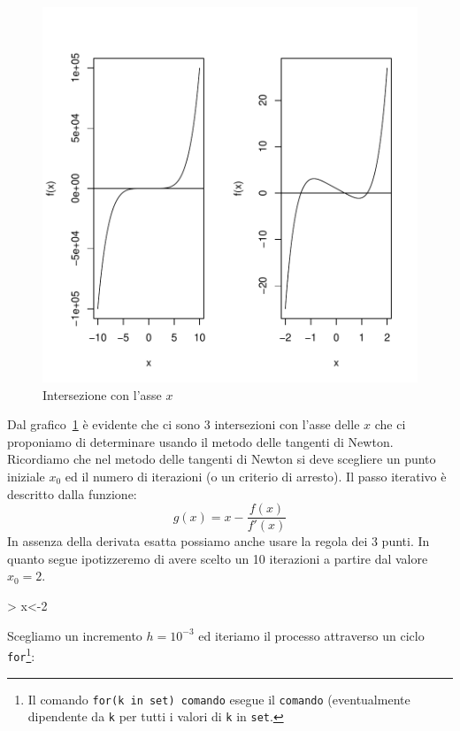 \documentclass[onecolumn,11pt]{book}
\begin{document}
\begin{figure}[htbp]
\begin{center}
\includegraphics{statisticaconR-104}
\caption{Intersezione con l'asse $x$ }
\label{fig:newton}
\end{center}
\end{figure}

Dal grafico~\ref{fig:newton}  \`e evidente che ci sono 3 intersezioni con l'asse delle $x$ che ci proponiamo di determinare usando il metodo delle tangenti di Newton. Ricordiamo che nel metodo delle tangenti di Newton si deve scegliere un punto iniziale $x_0$  ed il numero di iterazioni (o un criterio di arresto).  Il passo iterativo \`e descritto dalla funzione:
$$g(x)=x-\frac{f(x)}{f'(x)}$$
In assenza della derivata esatta possiamo anche usare la regola dei 3 punti.
In quanto segue ipotizzeremo di avere scelto un 10 iterazioni a partire dal valore $x_0=2$.

\begin{Schunk}
\begin{Sinput}
> x<-2
\end{Sinput}
\end{Schunk}
Scegliamo un incremento
$h=10^{-3}$ ed 
iteriamo il processo attraverso un ciclo \texttt{for}\footnote{Il comando   \texttt{for(k in set) comando} esegue il \texttt{comando} (eventualmente dipendente da \texttt{k} per tutti i valori di \texttt{k} in \texttt{set}. }:
\end{document}
